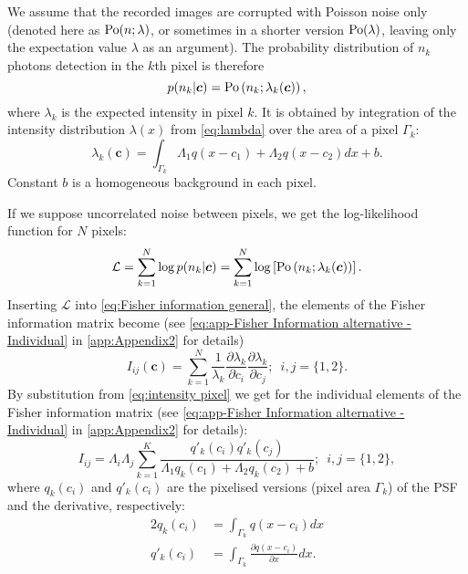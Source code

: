 We assume that the recorded images are corrupted with Poisson noise only (denoted here as $\mathrm{Po}(n;\lambda)$, or sometimes in a shorter version $\mathrm{Po}(\lambda)$, leaving only the expectation value $\lambda$ as an argument). The probability distribution of $n_k$ photons detection in the $k$th pixel is therefore
%
\begin{equation}
	p(n_k|\bm{c})=\mathrm{Po}\left(n_k;\lambda_k(\bm{c})\right),
\end{equation}
%
where $\lambda_k$ is the expected intensity in pixel $k$. It is obtained by integration of the intensity distribution $\lambda(x)$ from \autoref{eq:lambda} over the area of a pixel $\Gamma_k$:
%
\begin{equation}
	\lambda_k(\bm{c})=\int_{\Gamma_k}\Lambda_1q(x-c_1)+\Lambda_2q(x-c_2)dx+b.	
	\label{eq:intensity pixel}
\end{equation}
%
Constant $b$ is a homogeneous background in each pixel.

If we suppose uncorrelated noise between pixels, we get the log-likelihood function for $N$ pixels: 
%
\begin{equation}
	\mathcal{L}=\sum_{k=1}^N\log p(n_k|\bm{c})=\sum_{k=1}^N\log\left[\mathrm{Po}\left(n_k;\lambda_k(\bm{c})\right)\right].
	\label{eq:FREM likelihood Poisson}
\end{equation}
%
Inserting $\mathcal{L}$ into \autoref{eq:Fisher information general}, the elements of the Fisher information matrix become (see \autoref{eq:app-Fisher Information alternative - Individual} in \autoref{app:Appendix2} for details)
%
\begin{equation}
	I_{ij}(\bm{c})=\sum_{k=1}^N\frac{1}{\lambda_k}\frac{\partial\lambda_k}{\partial c_i}\frac{\partial\lambda_k}{\partial c_j};\; \ i,j=\{1,2\}.
	\label{eq:FI - entries}
\end{equation}
%
By substitution from \autoref{eq:intensity pixel} we get for the individual elements of the Fisher information matrix (see \autoref{eq:app-Fisher Information alternative - Individual} in \autoref{app:Appendix2} for details): 
%
\begin{equation}
	I_{ij} =\Lambda_i\Lambda_j\sum_{k=1}^{K}\frac{q'_k(c_i)q'_k(c_j)}{\Lambda_1q_k(c_1)+\Lambda_2q_k(c_2)+b};\; \ i,j=\{1,2\},
	\label{eq:FI - individual}
\end{equation}
%
where $q_k(c_i)$ and $q'_k(c_i)$ are the pixelised versions (pixel area $\Gamma_k$) of the PSF and the derivative, respectively:
%
\begin{alignat*}{2}
	q_k(c_i) & =\int_{\Gamma_k}q(x-c_i)dx\\
	q'_k(c_i) & =\int_{\Gamma_k}\frac{\partial q(x-c_i)}{\partial x}dx.
\end{alignat*}
%

